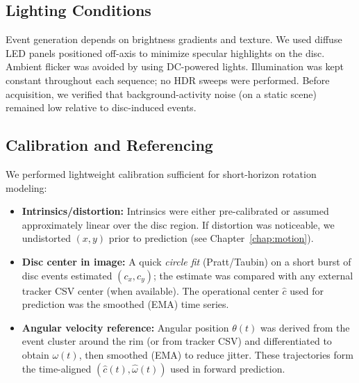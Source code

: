 \subsection{Lighting Conditions}
Event generation depends on brightness gradients and texture. We used diffuse LED panels positioned off-axis to minimize specular highlights on the disc. Ambient flicker was avoided by using DC-powered lights. Illumination was kept constant throughout each sequence; no HDR sweeps were performed. Before acquisition, we verified that background-activity noise (on a static scene) remained low relative to disc-induced events.

\subsection{Calibration and Referencing}
We performed lightweight calibration sufficient for short-horizon rotation modeling:

\begin{itemize}
  \item \textbf{Intrinsics/distortion:} Intrinsics were either pre-calibrated or assumed approximately linear over the disc region. If distortion was noticeable, we undistorted $(x,y)$ prior to prediction (see Chapter~\ref{chap:motion}).
  \item \textbf{Disc center in image:} A quick \emph{circle fit} (Pratt/Taubin) on a short burst of disc events estimated $(c_x,c_y)$; the estimate was compared with any external tracker CSV center (when available). The operational center $\hat c$ used for prediction was the smoothed (EMA) time series.
  \item \textbf{Angular velocity reference:} Angular position $\theta(t)$ was derived from the event cluster around the rim (or from tracker CSV) and differentiated to obtain $\omega(t)$, then smoothed (EMA) to reduce jitter. These trajectories form the time-aligned $(\hat c(t),\hat\omega(t))$ used in forward prediction.
\end{itemize}

